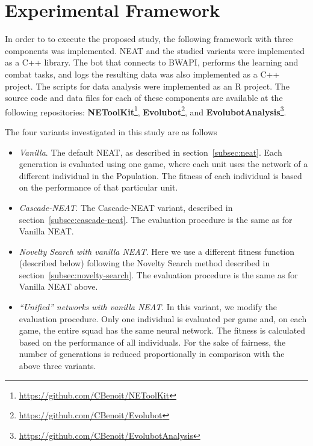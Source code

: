 \section{Experimental Framework}\label{section:proposal}

In order to to execute the proposed study, the following framework
with three components was implemented. NEAT and the studied varients
were implemented as a C++ library. The bot that connects to BWAPI,
performs the learning and combat tasks, and logs the resulting data
was also implemented as a C++ project. The scripts for data analysis
were implemented as an R project. The source code and data files for
each of these components are available at the following repositories:
{\bf NEToolKit}\footnote{\url{https://github.com/CBenoit/NEToolKit}},
{\bf Evolubot}\footnote{\url{https://github.com/CBenoit/Evolubot}}, and
{\bf EvolubotAnalysis}\footnote{\url{https://github.com/CBenoit/EvolubotAnalysis}}.

The four variants investigated in this study are as follows
\begin{itemize}
    \item \emph{Vanilla}. The default NEAT, as described in
      section~\ref{subsec:neat}. Each generation is evaluated using one
      game, where each unit uses the network of a different individual
      in the Population. The fitness of each individual is based on
      the performance of that particular unit.
    \item \emph{Cascade-NEAT}. The Cascade-NEAT variant, described in
      section~\ref{subsec:cascade-neat}. The evaluation procedure is
      the same as for Vanilla NEAT.
    \item \emph{Novelty Search with vanilla NEAT}. Here we use a
      different fitness function (described below) following the
      Novelty Search method described in
      section~\ref{subsec:novelty-search}. The evaluation procedure is
      the same as for Vanilla NEAT above.
    \item \emph{``Unified'' networks with vanilla NEAT}. In this
      variant, we modify the evaluation procedure. Only one individual
      is evaluated per game and, on each game, the entire squad has
      the same neural network. The fitness is calculated based on the
      performance of all individuals. For the sake of fairness, the
      number of generations is reduced proportionally in comparison
      with the above three variants.
\end{itemize}


